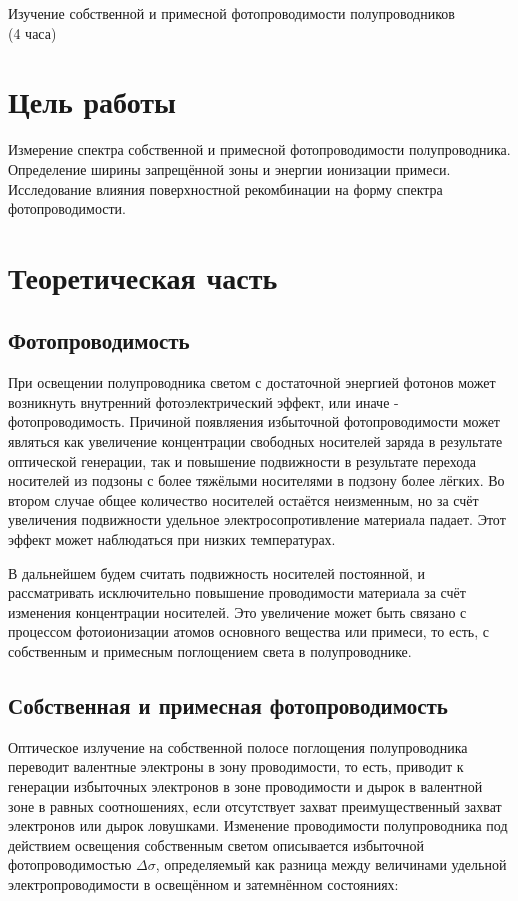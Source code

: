 \newpage

\setcounter{chapter}{7}

\begin{center}
Изучение собственной и примесной фотопроводимости полупроводников\\
(4 часа)
\end{center}

\section{Цель работы}
Измерение спектра собственной и примесной фотопроводимости полупроводника. Определение ширины запрещённой зоны и энергии ионизации примеси. Исследование влияния поверхностной рекомбинации на форму спектра фотопроводимости.

\section{Теоретическая часть}
\subsection{Фотопроводимость}
При освещении полупроводника светом с достаточной энергией фотонов может возникнуть внутренний фотоэлектрический эффект, или иначе - фотопроводимость. Причиной появляения  избыточной фотопроводимости может являться как увеличение концентрации свободных носителей заряда в результате оптической генерации, так и повышение подвижности в результате перехода носителей из подзоны с более тяжёлыми носителями в подзону более лёгких. Во втором случае общее количество носителей остаётся неизменным, но за счёт увеличения подвижности удельное электросопротивление материала падает. Этот эффект может наблюдаться при низких температурах.

В дальнейшем будем считать подвижность носителей постоянной, и рассматривать исключительно повышение проводимости материала за счёт изменения концентрации носителей. Это увеличение может быть связано с процессом фотоионизации атомов основного вещества или примеси, то есть, с собственным и примесным поглощением света в полупроводнике.

\subsection{Собственная и примесная фотопроводимость}
Оптическое излучение на собственной полосе поглощения полупроводника переводит валентные электроны в зону проводимости, то есть, приводит к генерации избыточных электронов в зоне проводимости и дырок в валентной зоне в равных соотношениях, если отсутствует захват преимущественный захват электронов или дырок ловушками.
Изменение проводимости полупроводника под действием освещения собственным светом описывается избыточной фотопроводимостью $\Delta \sigma$, определяемый как разница между величинами удельной электропроводимости в освещённом и затемнённом состояниях:

